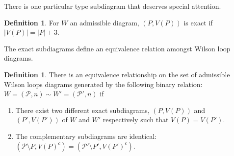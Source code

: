 \documentclass[11pt]{article}
\newcommand{\cP}{\mathcal{P}}
\theoremstyle{remark}
\theoremstyle{definition}
\newtheorem{dfn}[thm]{Definition}
\begin{document}
There is one particular type subdiagram that deserves special attention.

\begin{dfn}
For $W$ an admissible diagram, $(P, V(P))$ is exact if $|V(P)| = |P| + 3$.
\end{dfn}

The exact subdiagrams define an equivalence relation amongst Wilson loop diagrams.

\begin{dfn}\label{equivdfn} 
There is an equivalence relationship on the set of admissible Wilson loops diagrams generated by the following binary relation: $W = (\cP, n) \sim W'= (\cP', n)$ if
\begin{enumerate}
\item There exist two different exact subdiagrams, $(P, V(P))$ and $(P', V(P'))$ of $W$ and $W'$ respectively such that $V(P) =  V(P')$.
\item The complementary subdiagrams are identical: $(\cP \setminus P, V(P)^c) = (\cP' \setminus P', V(P')^c)$.
\end{enumerate}
\end{dfn}
\end{document}
